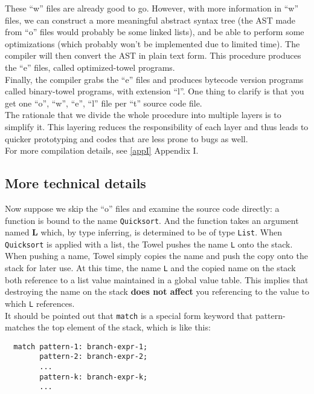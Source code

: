 \documentclass{article}
\begin{document}
These ``w'' files are already good to go. However, with more information in ``w'' files, we can construct a more meaningful abstract syntax tree (the AST made from ``o'' files would probably be some linked lists), and be able to perform some optimizations (which probably won't be implemented due to limited time). The compiler will then convert the AST in plain text form. This procedure produces the ``e'' files, called optimized-towel programs.\\

Finally, the compiler grabs the ``e'' files and produces bytecode version programs called binary-towel programs, with extension ``l''. One thing to clarify is that you get one ``o'', ``w'', ``e'', ``l'' file per ``t'' source code file.\\

The rationale that we divide the whole procedure into multiple layers is to simplify it. This layering reduces the responsibility of each layer and thus leads to quicker prototyping and codes that are less prone to bugs as well.\\

For more compilation details, see \ref{appI} Appendix I.

\subsection{More technical details}

Now suppose we skip the ``o'' files and examine the source code directly: a function is bound to the name \texttt{Quicksort}. And the function takes an argument named \textbf{L} which, by type inferring, is determined to be of type \texttt{List}. When \texttt{Quicksort} is applied with a list, the Towel pushes the name \texttt{L} onto the stack.\\

When pushing a name, Towel simply copies the name and push the copy onto the stack for later use. At this time, the name \texttt{L} and the copied name on the stack both reference to a list value maintained in a global value table. This implies that destroying the name on the stack \textbf{does not affect} you referencing to the value to which \texttt{L} references.\\

It should be pointed out that \texttt{match} is a special form keyword that pattern-matches the top element of the stack, which is like this:

\begin{Verbatim}
  match pattern-1: branch-expr-1;
        pattern-2: branch-expr-2;
        ...
        pattern-k: branch-expr-k;
        ...
\end{Verbatim}
\end{document}
